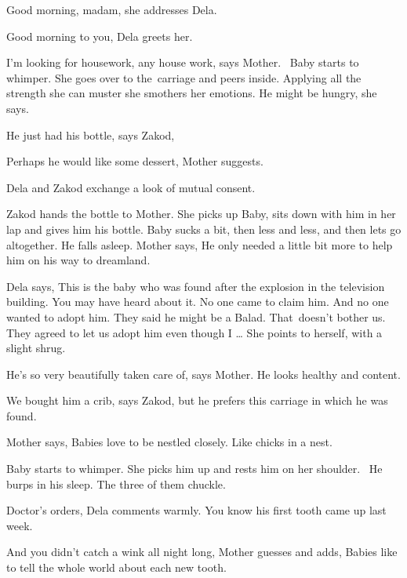 \documentclass[letterpaper]{article}
\begin{document}
{\textquotedbl}Good morning, madam,{\textquotedbl} she addresses Dela.

{\textquotedbl}Good morning to you,{\textquotedbl} Dela greets her. 

{\textquotedbl}I'm looking for housework, any house work,{\textquotedbl} says Mother. \ Baby starts to whimper. She goes
over to the~carriage and peers inside. Applying all the strength she can muster she smothers her emotions.
{\textquotedbl}He might be hungry,{\textquotedbl} she says.

{\textquotedbl}He just had his bottle,{\textquotedbl} says Zakod,

{\textquotedbl}Perhaps he would like some dessert,{\textquotedbl} Mother suggests.

Dela and Zakod exchange a look of mutual consent.

Zakod hands the bottle to Mother. She picks up Baby, sits down with him in her lap and gives him his bottle. Baby sucks
a bit, then less and less, and then lets go altogether. He falls asleep. Mother says, {\textquotedbl}He only needed a
little bit more to help him on his way to dreamland.{\textquotedbl} 

Dela says, {\textquotedbl}This is the baby who was found after the explosion in the television building. You may have
heard about it. No one came to claim him. And no one wanted to adopt him. They said he might be a Balad. That~doesn't
bother us. They agreed to let us adopt him even though I {\dots}{\textquotedbl} She points to herself, with a slight
shrug.

{\textquotedbl}He's so very beautifully taken care of,{\textquotedbl} says Mother. {\textquotedbl}He looks healthy and
content.{\textquotedbl} 

{\textquotedbl}We bought him a crib,{\textquotedbl} says Zakod, {\textquotedbl}but he prefers this carriage in which he
was found.{\textquotedbl} 

Mother says, {\textquotedbl}Babies love to be nestled closely. Like chicks in a nest.{\textquotedbl} 

Baby starts to whimper. She picks him up and rests him on her shoulder. ~He burps in his sleep. The three of them
chuckle. 

{\textquotedbl}Doctor's orders,{\textquotedbl} Dela comments warmly. {\textquotedbl}You know his first tooth came up
last week.{\textquotedbl}~ 

{\textquotedbl}And you didn't catch a wink all night long,{\textquotedbl} Mother guesses and adds, {\textquotedbl}Babies
like to tell the whole world about each new tooth.{\textquotedbl} 
\end{document}
